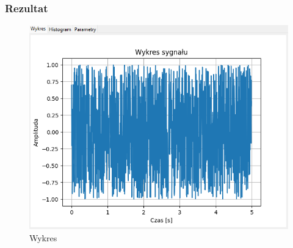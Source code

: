 \documentclass{article}
\begin{document}
\subsubsection{Rezultat}
    \begin{figure}[h!]
        \centering
        \includegraphics[width=\textwidth]{img/szum-jednost/wykres.png}
        \caption{Wykres}
    \end{figure}
\end{document}
